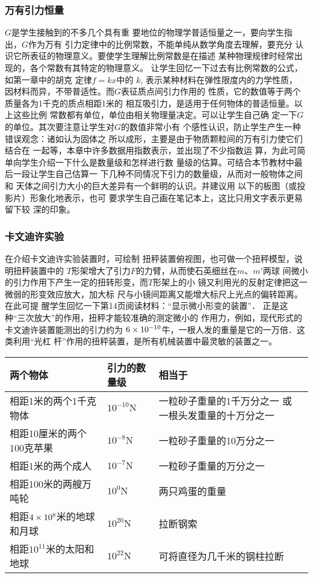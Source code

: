 \subsubsection{万有引力恒量} 
$G$是学生接触到的不多几个具有重
要地位的物理学普适恒量之一，要向学生指出，$G$作为万有
引力定律中的比例常数，不能单纯从数学角度去理解，要充分
认识它所表征的物理意义。要使学生理解比例常数是在描述
某种物理规律时经常出现的，各个常数有其特定的物理意义。
让学生回忆一下过去有比例常数的公式，如第一章中的胡克
定律$f=kx$中的 $k$, 表示某种材料在弹性限度内的力学性质，
因材料而异，不带普适性。而$G$表征质点间引力作用的
性质，它的数值等于两个质量各为1千克的质点相距1米的
相互吸引力，是适用于任何物体的普适恒量。以上这些比例
常数都有单位，单位由相关物理量决定。可以让学生自己确
定一下$G$的单位。其次要注意让学生对$G$的数值非常小有
个感性认识，防止学生产生一种错误观念：诸如认为固体之
所以成形，主要是由于物质颗粒间的万有引力使它们结合在
一起等，本章中许多数据用指数表示，並出现了不少指数运
算，为此可简单向学生介绍一下什么是数量级和怎样进行数
量级的估算。可结合本节教材中最后一段让学生自己估算一
下几种不同情况下引力的数量级，从而对一般物体之间和
天体之间引力大小的巨大差异有一个鲜明的认识。并建议用
以下的板图（或投影片）形象化地表示，也可
要求学生自己画在笔记本上，这比只用文字表示更易留下较
深的印象。

\subsubsection{卡文迪许实验}

在介绍卡文迪许实验装置时，可绘制
扭秤装置俯视图，也可做一个扭秤模型，说明扭秤装置中的
$T$形架增大了引力$F$的力臂，从而使石英细丝在$m$、$m'$两球
间微小的引力作用下产生一定的扭转形变，而$T$形架上的小
镜又利用光的反射定律把这一微弱的形变效应放大，加大标
尺与小镜间距离又能增大标尺上光点的偏转距离。在此可提
醒学生回忆一下第14页阅读材料：“显示微小形变的装置”．
正是这种“三次放大”的作用，扭秤才能较准确的测定微小的
作用力，例如，现代形式的卡文迪许装置能测出的引力约为
$6\times10^{-10}$牛，一根人发的重量是它的一万倍．这类利用“光杠
杆”作用的扭秤装置，是所有机械装置中最灵敏的装置之一。

\begin{center}
\begin{tabular}{p{}p{}p{}}
    \hline
    两个物体 &引力的数量级 &相当于\\
    \hline
相距1米的两个1千克物体 & $10^{-10}$N  &  一粒砂子重量的1千万分之一 或 一根头发重量的十万分之一\\
相距10厘米的两个100克苹果 & $10^{-8}$N  &  一粒砂子重量的10万分之一\\
相距1米的两个成人 & $10^{-7}$N  &  一粒砂子重量的万分之一\\
相距100米的两艘万吨轮 & $10^0$N  &  两只鸡蛋的重量\\
相距$4\times 10^8$米的地球和月球 & $10^{20}$N  & 拉断钢索\\
相距$10^{11}$米的太阳和地球 & $10^{22}$N  &  可将直径为几千米的钢柱拉断\\
    \hline
\end{tabular}
\end{center}

